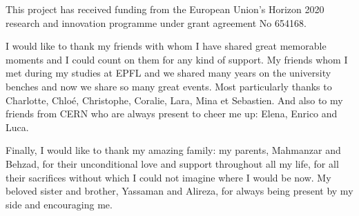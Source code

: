 This project has received funding from the European Union’s Horizon
2020 research and innovation programme under grant agreement No
654168.

I would like to thank my friends with whom I have shared great
memorable moments and I could count on them for any kind of
support. My friends whom I met during my studies at EPFL and we shared
many years on the university benches and now we share so many great
events. Most particularly thanks to Charlotte, Chloé, Christophe,
Coralie, Lara, Mina et Sebastien. And also to my friends from CERN who
are always present to cheer me up: Elena, Enrico and Luca.

Finally, I would like to thank my amazing family: my parents,
Mahmanzar and Behzad, for their unconditional love and support
throughout all my life, for all their sacrifices without which I could
not imagine where I would be now. My beloved sister and brother,
Yassaman and Alireza, for always being present by my side and
encouraging me.


